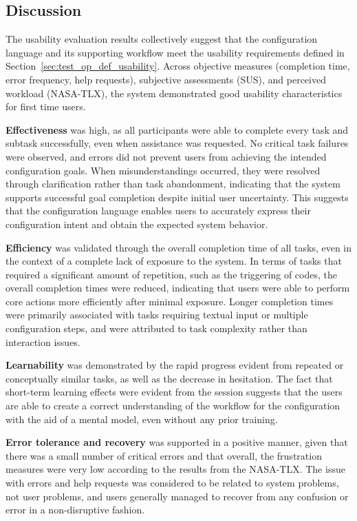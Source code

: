 \subsection{Discussion}
\label{sec:test_usabl_obs}

The usability evaluation results collectively suggest that the configuration language and its supporting workflow meet the usability requirements defined in Section~\ref{sec:test_op_def_usability}. Across objective measures (completion time, error frequency, help requests), subjective assessments (\gls{SUS}), and perceived workload (NASA-\gls{TLX}), the system demonstrated good usability characteristics for first time users.

\textbf{Effectiveness} was high, as all participants were able to complete every task and subtask successfully, even when assistance was requested. No critical task failures were observed, and errors did not prevent users from achieving the intended configuration goals. When misunderstandings occurred, they were resolved through clarification rather than task abandonment, indicating that the system supports successful goal completion despite initial user uncertainty. This suggests that the configuration language enables users to accurately express their configuration intent and obtain the expected system behavior.

\textbf{Efficiency} was validated through the overall completion time of all tasks, even in the context of a complete lack of exposure to the system. In terms of tasks that required a significant amount of repetition, such as the triggering of codes, the overall completion times were reduced, indicating that users were able to perform core actions more efficiently after minimal exposure. Longer completion times were primarily associated with tasks requiring textual input or multiple configuration steps, and were attributed to task complexity rather than interaction issues.

\textbf{Learnability} was demonstrated by the rapid progress evident from repeated or conceptually similar tasks, as well as the decrease in hesitation. The fact that short-term learning effects were evident from the session suggests that the users are able to create a correct understanding of the workflow for the configuration with the aid of a mental model, even without any prior training.

\textbf{Error tolerance and recovery} was supported in a positive manner, given that there was a small number of critical errors and that overall, the frustration measures were very low according to the results from the NASA-\gls{TLX}. The issue with errors and help requests was considered to be related to system problems, not user problems, and users generally managed to recover from any confusion or error in a non-disruptive fashion.

